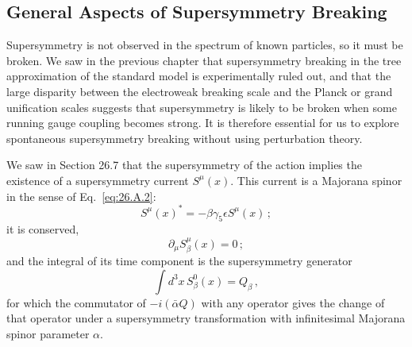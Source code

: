 
\subsection{General Aspects of Supersymmetry Breaking}

Supersymmetry is not observed in the spectrum of known particles, so it
must be broken. We saw in the previous chapter that supersymmetry breaking
in the tree approximation of the standard model is experimentally ruled
out, and that the large disparity between the electroweak breaking scale
and the Planck or grand unification scales suggests that supersymmetry is
likely to be broken when some running gauge coupling becomes strong. It is
therefore essential for us to explore spontaneous supersymmetry breaking
without using perturbation theory.

We saw in Section 26.7 that the supersymmetry of the action implies the
existence of a supersymmetry current \(S^\mu(x)\). This current is a
Majorana spinor in the sense of Eq.~\eqref{eq:26.A.2}:
\begin{equation}
  S^\mu(x)^*
  =-\beta\gamma_5\epsilon S^\mu(x)\,;
  \tag{29.1.1}\label{eq:29.1.1}
\end{equation}
it is conserved,
\begin{equation}
  \partial_\mu S^\mu_\beta(x)=0\,;
  \tag{29.1.2}\label{eq:29.1.2}
\end{equation}
and the integral of its time component is the supersymmetry generator
\begin{equation}
  \int d^3x\,S^0_\beta(x)=Q_\beta\,,
  \tag{29.1.3}\label{eq:29.1.3}
\end{equation}
for which the commutator of \(-i(\bar\alpha Q)\) with any operator gives
the change of that operator under a supersymmetry transformation with
infinitesimal Majorana spinor parameter \(\alpha\).

